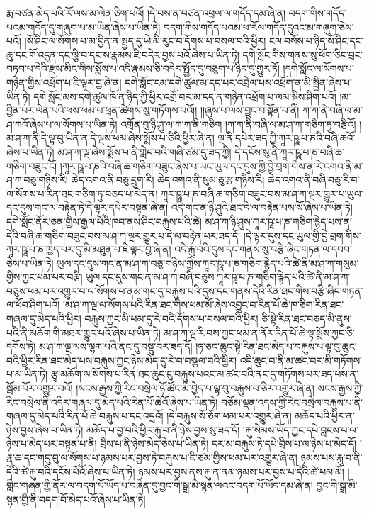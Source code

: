 རྨ་བཙན་མེད་པའི་རོ་ལས་མ་ལེན་ཅིག་པའོ། །དེ་བས་ན་བཙན་འཕྲལ་ལ་གདོད་དམ་ཞེ་ན། བདག་གིས་གདོད་པའམ་གདོད་དུ་གཞུག་པ་མ་ཡིན་ཞེས་པ་ཡིན་ཏེ། བདག་གིས་གདོད་པའམ་ཕ་རོལ་གདོད་དུའང་མ་གཞུག་ཅེས་པའོ། །སོ་ཤིང་ལ་སོགས་པ་མ་བྱིན་ན་སྤྱད་དུ་ཡེ་མི་རུང་བ་དོགས་པ་བསལ་བའི་ཕྱིར། ངལ་བསོས་པ་ཉིད་སོ་ཤིང་དང་ཆུ་དང་གོ་འདུན་དང་ལྕི་བ་དང་ས་རྣམས་ཇི་བདེར་བྱས་པའོ་ཞེས་པ་ཡིན་ཏེ། དགེ་སློང་གིས་གནས་སུ་ཕོག་ཅིང་བྲང་བཏབ་པ་དེའི་རྫས་མིང་གིས་སྨོས་པ་འདི་རྣམས་ཅི་བདེར་སྤྱོད་དུ་བཅུག་པ་ཉིད་དུ་གྱུར་ཏོ། །དགེ་སློང་ལ་སོགས་པ་གཉེན་གྱིས་འཕྲོག་པ་ཇི་ལྟར་བྱ་ཞེ་ན། དགེ་སློང་ངམ་དགེ་ཚུལ་མ་དད་པར་འབྲེལ་པས་འཕྲོག་ན་མི་སྦྱིན་ཞེས་པ་ཡིན་ཏེ། དགེ་སློང་མས་དགེ་ཚུལ་ཁོ་ན་ཉིད་ཀྱི་ཕྱིར་འགྲོ་བར་མ་དད་ན་གཉེན་འཕྲོག་པ་ལམ་སྐྲིས་ཤིག་པའོ། །མ་བྱིན་པར་ལེན་པའི་ཕས་ཕམ་པ་ཕྲན་ཚེགས་སུ་གཏོགས་པའོ།། །།ཞུས་པ་ལས་བྱུང་བ་སྟོན་པ་ནི། ཀ་ཀ་ནི་བཞི་ལ་མ་ཤ་ཀའོ་ཞེས་པ་ལ་སོགས་པ་ཡིན་ཏེ། འགྲོན་བུ་ཉི་ཤུ་ལ་ཀ་ཀ་ནི་གཅིག །ཀ་ཀ་ནི་བཞི་ལ་མ་ཤ་ཀ་གཅིག་ཏུ་བརྩིའོ། །མ་ཤ་ཀ་ནི་དེ་ལྟ་བུ་ཡིན་ན་དེ་ལྔས་ཕམ་ཞེས་སྨོས་པ་ཅིའི་ཕྱིར་ཞེ་ན། ལྔ་ནི་དཔེར་ཟད་ཀྱི་ཀཱར་ཥཱ་པ་ཎའི་བཞི་ཆའོ་ཞེས་པ་ཡིན་ཏེ། མ་ཤ་ཀ་ལྔ་ཞེས་སྨོས་པ་ནི་གླེང་བའི་གཞི་ཙམ་དུ་ཟད་ཀྱི། དེ་དངོས་སུ་ནི་ཀཱར་ཥཱ་པ་ཎ་བཞི་ཆ་གཅིག་བཟུང་ངོ། །ཀཱར་ཥཱ་པ་ཎའི་བཞི་ཆ་གཅིག་བཟུང་ཞེས་པ་ཡང་ཡུལ་དང་དུས་ཀྱི་བྱེ་བྲག་གིས་ན་རེ་འགའ་ནི་མ་ཤ་ཀ་བཅུ་གཉིས་རི། ཆེད་འགའ་ནི་བཅུ་དྲུག་རི། ཆེད་འགའ་ནི་སུམ་ཅུ་རྩ་གཉིས་རི། ཆེད་འགའ་ནི་བཞི་བཅུ་རི་བ་ལ་སོགས་པ་རིན་ཐང་གཅིག་ཏུ་བཅད་པ་མེད་ན། ཀཱར་ཥཱ་པ་ཎ་བཞི་ཆ་གཅིག་བཟུང་བས་མ་ཤ་ཀ་ལྔར་གྱུར་པ་ཡུལ་དང་དུས་གང་ལ་བརྟེན་ཏེ་དེ་ལྟར་དཔེར་བསྟན་ཞེ་ན། འདི་གང་ན་ཉི་ཤུའི་ཐང་དེ་ལ་བརྟེན་པས་སོ་ཞེས་པ་ཡིན་ཏེ། དགེ་སློང་ནོར་ཅན་གྱིས་རྒྱལ་པོའི་ཁབ་ནས་ཤིང་བརྐུས་པའི་ཚེ། མ་ཤ་ཀ་ཉི་ཤུས་ཀཱར་ཥཱ་པ་ཎ་གཅིག་རྙེད་པས་ན། དེའི་བཞི་ཆ་གཅིག་བཟུང་བས་མ་ཤ་ཀ་ལྔར་གྱུར་པ་དེ་ལ་བརྟེན་པར་ཟད་དོ། །དེ་ལྟར་དུས་དང་ཡུལ་གྱི་བྱེ་བྲག་གིས་ཀཱར་ཥཱ་པ་ཎ་ཁྱད་པར་དུ་མི་མཐུན་པ་ཇི་ལྟར་བྱ་ཞེ་ན། འདི་རྐུ་བའི་དུས་དང་གནས་སུ་བརྩི་ཞིང་གཏན་ལ་དབབ་ཅེས་པ་ཡིན་ཏེ། ཡུལ་དང་དུས་གང་ན་མ་ཤ་ཀ་བཅུ་གཉིས་ཀྱིས་ཀཱར་ཥཱ་པ་ཎ་གཅིག་རྙེད་པའི་ཚེ་ནི་མ་ཤ་ཀ་གསུམ་གྱིས་ཀྱང་ཕམ་པར་བརྩི། ཡུལ་དང་དུས་གང་ན་མ་ཤ་ཀ་བཞི་བཅུས་ཀཱར་ཥཱ་པ་ཎ་གཅིག་རྙེད་པའི་ཚེ་ནི་མ་ཤ་ཀ་བཅུས་ཕམ་པར་འགྱུར་བ་ལ་སོགས་པ་ནམ་གང་དུ་བརྐུས་པའི་དུས་དང་གནས་དེའི་རིན་ཐང་གིས་བརྩི་ཞིང་གཏན་ལ་ཕོབ་ཤིག་པའོ། །མ་ཤ་ཀ་ལྔ་ལ་སོགས་པའི་རིན་ཐང་གིས་ཕམ་མོ་ཞེས་འབྱུང་བ་རིན་པོ་ཆེ་ཁ་ཅིག་རིན་ཐང་གཞལ་དུ་མེད་པའི་ཕྱིར། བརྐུས་ཀྱང་མི་ཕམ་དུ་རེ་བའི་དོགས་པ་བསལ་བའི་ཕྱིར། ཅི་སྟེ་རིན་ཐང་བཅད་མི་ནུས་པའི་ནི་མཆོག་གི་མཐར་གྱུར་པའོ་ཞེས་པ་ཡིན་ཏེ། མ་ཤ་ཀ་ལྔ་རི་བས་ཀྱང་ཕམ་ན་ནོར་རིན་པོ་ཆེ་ལྟ་སྨོས་ཀྱང་ཅི་དགོས་ཏེ། མ་ཤ་ཀ་ལྔ་ལས་ལྷག་པའི་ནང་དུ་བསྡུ་བར་ཟད་དོ། །ཧ་ཅང་ཆུང་སྟེ་རིན་ཐང་མེད་པ་བརྐུས་པ་ལྟ་བུ་ཆུང་བའི་ཕྱིར་རིན་ཐང་མེད་པས་བརྐུས་ཀྱང་ཉེས་མེད་དུ་རེ་བ་བསྩལ་བའི་ཕྱིར། འདི་ཆུང་བ་ནི་མ་ཚང་བར་མི་གཏོགས་པ་མ་ཡིན་ཏེ། རྩྭ་མཆོག་ལ་སོགས་པ་རིན་ཐང་ཆུང་ངུ་བརྐུས་པའང་མ་ཚང་བའི་ནང་དུ་གཏོགས་པར་ཟད་པས་ན་སྦོམ་པོར་འགྱུར་བའོ། །སངས་རྒྱས་ཀྱི་རིང་བསྲེལ་ཉོ་ཚོང་མི་བྱེད་པ་ལྟ་བུ་བརྐུས་པ་ཅིར་འགྱུར་ཞེ་ན། སངས་རྒྱས་ཀྱི་རིང་བསྲེལ་ནི་འདིར་གཞལ་དུ་མེད་པའི་རིན་པོ་ཆེའོ་ཞེས་པ་ཡིན་ཏེ། བཅོམ་ལྡན་འདས་ཀྱི་རིང་བསྲེལ་བརྐུས་པ་ནི་གཞལ་དུ་མེད་པའི་རིན་པོ་ཆེ་བརྐུས་པ་དང་འདྲའོ། །དེ་བརྐུས་སོ་ཅོག་ཕམ་པར་འགྱུར་ཞེ་ན། མཆོད་པའི་ཕྱིར་ན་ཉེས་བྱས་ཞེས་པ་ཡིན་ཏེ། མཆོད་པ་བྱ་བའི་ཕྱིར་རྐུ་བ་ནི་ཉེས་བྱས་སུ་ཟད་དོ། །རྐུ་སེམས་ཡོད་ཀྱང་དཔེ་བླངས་པ་ལ་ཉེས་པ་མེད་པར་བསྟན་པ་ནི། བྲིས་པ་ནི་ཉེས་མེད་ཅེས་པ་ཡིན་ཏེ། དར་མ་བརྐུས་ཏེ་དཔེ་བྲིས་པ་ལ་ཉེས་པ་མེད་དོ། །རྣ་ཆ་དང་གདུ་བུ་ལ་སོགས་པ་ཉམས་པར་བྱས་ཏེ་བརྐུས་པ་ཇི་ཙམ་གྱིས་ཕམ་པར་འགྱུར་ཞེ་ན། ཉམས་པས་རྐུ་བ་ནི་དེའི་ཚེ་རྐུ་བའི་དངོས་པོའོ་ཞེས་པ་ཡིན་ཏེ། ཉམས་པར་བྱས་ནས་རྐུ་ན་ནམ་ཉམས་པར་བྱས་པ་དེའི་ཚེ་ཕམ་མོ། །གླིང་གཞན་གྱི་ནོར་ལ་བདག་པོ་ཡོད་པ་བཞིན་དུ་བྱང་གི་སྒྲ་མི་སྙན་ལའང་བདག་པོ་ཡོད་དམ་ཞེ་ན། བྱང་གི་སྒྲ་མི་སྙན་གྱི་ནི་བདག་བོ་མེད་པའོ་ཞེས་པ་ཡིན་ཏེ། 